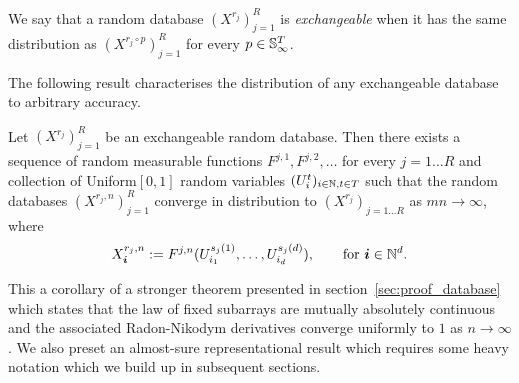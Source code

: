 
\begin{definition}
We say that a random database $(X^{r_j})_{j=1}^R$ is \emph{exchangeable} when it has the same distribution as $(X^{r_j\circ p})_{j=1}^R$ for every $p \in \mathbb{S}_{\infty}^T$.
\end{definition}




The following result characterises the distribution of any exchangeable database to arbitrary accuracy.

\begin{cor}
  \label{cor:simple-database}
   Let $(X^{r_j})_{j=1}^R$ be an exchangeable random database.
   Then there exists a sequence of random measurable functions $F^{j,1}, F^{j,2}, \dotsc$ for 
   every $j=1\ldots R$ and collection of \iid Uniform$[0,1]$ random variables $(U^t_i)_{i\in\mathbb{N},t \in T}$ such that 
   the random databases $(X^{r_j,n})_{j=1}^R$
    converge in distribution to $(X^{r_j})_{j=1\ldots R}$ as $mn\to \infty$, where   
   \[
     X^{r_j,n}_{\bm{i}} := F^{j,n}(U^{s_j(1)}_{i_1},\dotsc,U^{s_j(d)}_{i_d}), \qquad \text{for } \bm{i} \in \mathbb{N}^d.
   \]
\end{cor}

This a corollary of a stronger theorem presented in section~\ref{sec:proof_database} which states that the law of fixed subarrays are mutually absolutely continuous and the associated Radon-Nikodym derivatives converge uniformly to $1$ as $n \to \infty$.
We also preset an almost-sure representational result which requires some heavy notation which we build up in subsequent sections.


